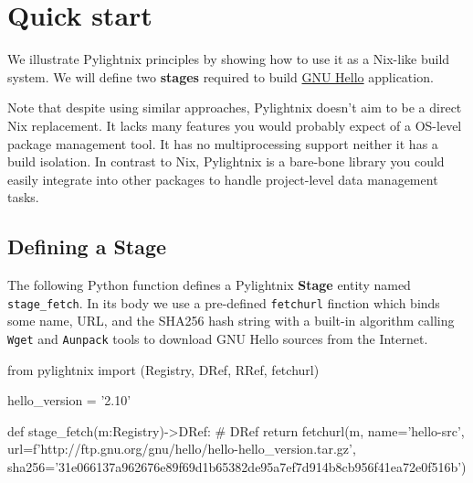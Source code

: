 \section{Quick start}

We illustrate Pylightnix principles by showing how to use it as a Nix-like build
system. We will define two \textbf{stages} required to build
\href{https://www.gnu.org/software/hello/}{GNU Hello} application.

Note that despite using similar approaches, Pylightnix doesn't aim to be a
direct Nix replacement. It lacks many features you would probably expect of a
OS-level package management tool. It has no multiprocessing support neither it
has a build isolation. In contrast to Nix, Pylightnix is a bare-bone library you
could easily integrate into other packages to handle project-level data
management tasks.

\subsection{Defining a Stage}

The following Python function defines a Pylightnix \textbf{Stage} entity named
\texttt{stage\_fetch}. In its body we use a pre-defined \texttt{fetchurl}
finction which binds some name, URL, and the SHA256 hash string with a built-in
algorithm calling \texttt{Wget} and \texttt{Aunpack} tools to download GNU Hello
sources from the Internet.

\begin{pythontexcode}
from pylightnix import (Registry, DRef, RRef, fetchurl)

hello_version = '2.10'

def stage_fetch(m:Registry)->DRef: # DRef \label{DREF}
  return fetchurl(m,
    name='hello-src',
    url=f'http://ftp.gnu.org/gnu/hello/hello-{hello_version}.tar.gz',
    sha256='31e066137a962676e89f69d1b65382de95a7ef7d914b8cb956f41ea72e0f516b')
\end{pythontexcode}

